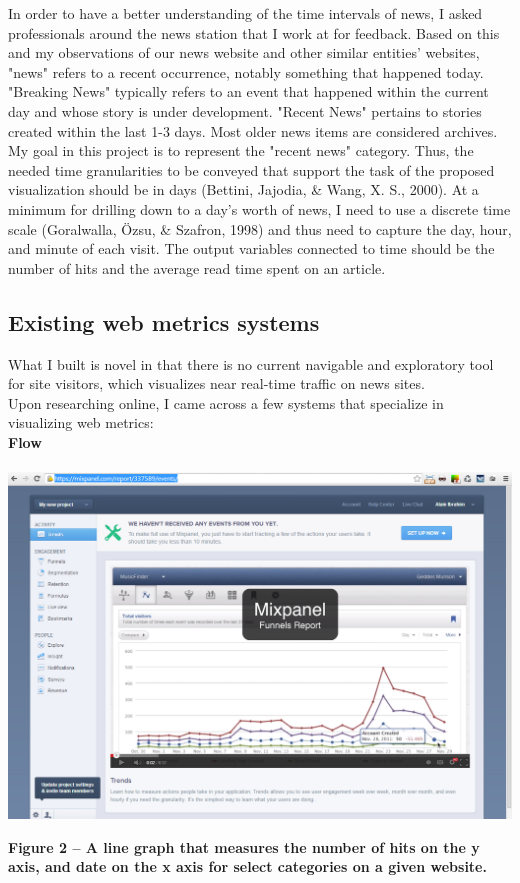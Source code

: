 \documentclass[12pt]{article}
\begin{document}
In order to have a better understanding of the time intervals of news, I asked professionals around the news station that I work at for feedback. Based on this and my observations of our news website and other similar entities' websites, "news" refers to a recent occurrence, notably something that happened today. "Breaking News" typically refers to an event that happened within the current day and whose story is under development. "Recent News" pertains to stories created within the last 1-3 days. Most older news items are considered archives. \\
 My goal in this project is to represent the "recent news" category. Thus, the needed time granularities to be conveyed that support the task of the proposed visualization should be in days (Bettini, Jajodia, \& Wang, X. S., 2000). At a minimum for drilling down to a day's worth of news, I need to use a discrete time scale (Goralwalla, \"{O}zsu, \& Szafron, 1998) and thus need to capture the day, hour, and minute of each visit. The output variables connected to time should be the number of hits and the average read time spent on an article.

\newpage

\subsection{Existing web metrics systems}
What I built is novel in that there is no current navigable and exploratory tool for site visitors, which visualizes near real-time traffic on news sites. \\
Upon researching online, I came across a few systems that specialize in visualizing web metrics: \\

\noindent\textbf{Flow} \\ \\
\noindent\includegraphics[scale=0.45]{img/flow}
\begin{singlespace}
\noindent\textbf{Figure 2 -- A line graph that measures the number of hits on the y axis, and date on the x axis for select categories on a given website.} \\
\end{singlespace}
\end{document}
